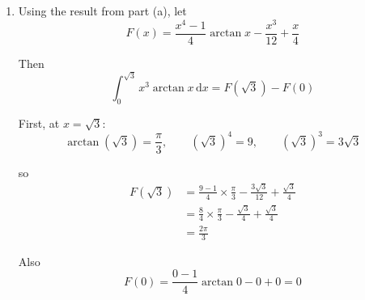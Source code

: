 \documentclass[leqno]{article}
\begin{document}
\begin{enumerate}[
  label=\textbf{\arabic*.},
  leftmargin=*,
  topsep=0pt,
  partopsep=0pt,
  parsep=0pt
]
\begin{djsSolution}
\begin{enumerate}[label=\textbf{(\alph*)}]
  so that
  \[
  \frac{\mathrm{d}u}{\mathrm{d}x}=\frac{1}{1+x^2}, \qquad v=\frac{x^4}{4}
  \]

  Using integration by parts:
  \[
  \int u\frac{\mathrm{d}v}{\mathrm{d}x}\,\mathrm{d}x = uv - \int v\frac{\mathrm{d}u}{\mathrm{d}x}\,\mathrm{d}x
  \]

  So
  \begin{align*}
  \int x^3\arctan x\,\mathrm{d}x
  &= \frac{x^4}{4}\arctan x-\int \frac{x^4}{4(1+x^2)}\,\mathrm{d}x \\
  &= \frac{x^4}{4}\arctan x-\frac14\int \frac{x^4}{1+x^2}\,\mathrm{d}x
  \end{align*}

  Now simplify the fraction by division:
  \[
  \frac{x^4}{1+x^2}=x^2-1+\frac{1}{1+x^2}
  \]

  since
  \[
  (1+x^2)(x^2-1)+1=x^4-1+1=x^4
  \]

  So
  \begin{align*}
  \int x^3\arctan x\,\mathrm{d}x
  &= \frac{x^4}{4}\arctan x-\frac14\int \left(x^2-1+\frac{1}{1+x^2}\right)\,\mathrm{d}x \\
  &= \frac{x^4}{4}\arctan x-\frac14\left(\int x^2\,\mathrm{d}x-\int 1\,\mathrm{d}x+\int \frac{1}{1+x^2}\,\mathrm{d}x\right) \\
  &= \frac{x^4}{4}\arctan x-\frac14\left(\frac{x^3}{3}-x+\arctan x\right)+c \\
  &= \frac{x^4}{4}\arctan x-\frac{x^3}{12}+\frac{x}{4}-\frac14\arctan x+c \\
  &= \frac{x^4-1}{4}\arctan x-\frac{x^3}{12}+\frac{x}{4}+c
  \end{align*}

  \item Using the result from part (a), let
  \[
  F(x)=\frac{x^4-1}{4}\arctan x-\frac{x^3}{12}+\frac{x}{4}
  \]

  Then
  \[
  \int_0^{\sqrt3} x^3\arctan x\,\mathrm{d}x=F(\sqrt3)-F(0)
  \]

  First, at \(x=\sqrt3\):
  \[
  \arctan(\sqrt3)=\frac{\pi}{3}, \qquad (\sqrt3)^4=9, \qquad (\sqrt3)^3=3\sqrt3
  \]

  so
  \begin{align*}
  F(\sqrt3)
  &= \frac{9-1}{4}\times \frac{\pi}{3}-\frac{3\sqrt3}{12}+\frac{\sqrt3}{4} \\
  &= \frac{8}{4}\times \frac{\pi}{3}-\frac{\sqrt3}{4}+\frac{\sqrt3}{4} \\
  &= \frac{2\pi}{3}
  \end{align*}

  Also
  \[
  F(0)=\frac{0-1}{4}\arctan 0-0+0=0
  \]


\end{enumerate}
\end{djsSolution}
\end{enumerate}
\end{document}
